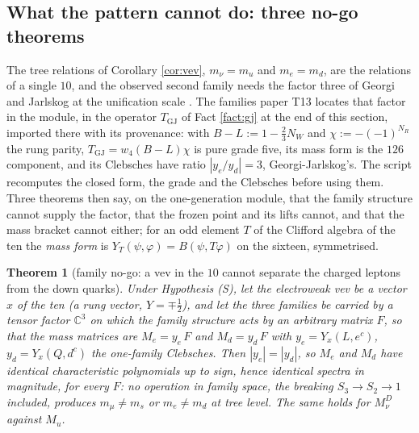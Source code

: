 \documentclass[11pt]{article}
\newtheorem{theorem}{Theorem}[section]
\theoremstyle{definition}
\newcommand{\C}{\mathbb{C}}
\begin{document}
\subsection{What the pattern cannot do: three no-go theorems}\label{subsec:nogo}

The tree relations of Corollary \ref{cor:vev}, $m_{\nu} = m_{u}$ and $m_{e} = m_{d}$, are the relations of a single $10$, and the observed second family needs the factor three of Georgi and Jarlskog at the unification scale \cite{GeorgiJarlskog1979}. The families paper T13 \cite{ButlerT13} locates that factor in the module, in the operator $T_{\mathrm{GJ}}$ of Fact \ref{fact:gj} at the end of this section, imported there with its provenance: with $B - L := 1 - \tfrac23 N_{W}$ and $\chi := -(-1)^{N_{R}}$ the rung parity, $T_{\mathrm{GJ}} = w_{4}(B - L)\chi$ is pure grade five, its mass form is the $126$ component, and its Clebsches have ratio $|y_{e}/y_{d}| = 3$, Georgi-Jarlskog's. The script recomputes the closed form, the grade and the Clebsches before using them. Three theorems then say, on the one-generation module, that the family structure cannot supply the factor, that the frozen point and its lifts cannot, and that the mass bracket cannot either; for an odd element $T$ of the Clifford algebra of the ten the \emph{mass form} is $Y_{T}(\psi, \varphi) = B(\psi, T\varphi)$ on the sixteen, symmetrised.

\begin{theorem}[family no-go: a vev in the $10$ cannot separate the charged leptons from the down quarks]\label{thm:familynogo}
Under Hypothesis (S), let the electroweak vev be a vector $x$ of the ten (a rung vector, $Y = \mp\tfrac12$), and let the three families be carried by a tensor factor $\C^{3}$ on which the family structure acts by an arbitrary matrix $F$, so that the mass matrices are $M_{e} = y_{e}\,F$ and $M_{d} = y_{d}\,F$ with $y_{e} = Y_{x}(L, e^{c})$, $y_{d} = Y_{x}(Q, d^{c})$ the one-family Clebsches. Then $|y_{e}| = |y_{d}|$, so $M_{e}$ and $M_{d}$ have identical characteristic polynomials up to sign, hence identical spectra in magnitude, for every $F$: no operation in family space, the breaking $S_{3} \to S_{2} \to 1$ included, produces $m_{\mu} \neq m_{s}$ or $m_{e} \neq m_{d}$ at tree level. The same holds for $M_{\nu}^{D}$ against $M_{u}$.
\end{theorem}
\end{document}
